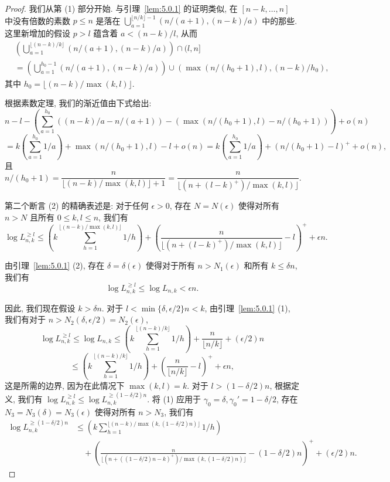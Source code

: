 \begin{proof}
我们从第 (1) 部分开始.
与引理~\ref{lem:5.0.1} 的证明类似, 在 $[n-k,\ldots,n]$ 中没有倍数的素数 $p \le n$ 是落在 $\bigcup_{a=1}^{\lfloor n/k\rfloor-1} (n/(a+1),(n-k)/a)$ 中的那些.
这里新增加的假设 $p > l$ 蕴含着 $a < (n-k)/l$, 从而
\[ \begin{split} 
& \left( \bigcup_{a=1}^{\lfloor (n-k)/k \rfloor} (n/(a+1), (n-k)/a) \right) \cap (l, n] \\ 
& = \left( \bigcup_{a=1}^{h_0-1} (n/(a+1), (n-k)/a) \right) \cup (\max(n/(h_0+1), l), (n-k)/h_0), 
\end{split} \]
其中 $h_0 = \lfloor (n - k)/\max(k, l) \rfloor$.

根据素数定理, 我们的渐近值由下式给出:
\[ n - l - \left(\sum_{a=1}^{h_0} ((n-k)/a - n/(a+1)) - (\max(n/(h_0+1), l) - n/(h_0+1))\right) + o(n) \]
\[ = k \left( \sum_{a=1}^{h_0} 1/a \right) + \max(n/(h_0 + 1), l) - l + o(n) = k \left( \sum_{a=1}^{h_0} 1/a \right) + (n/(h_0 + 1) - l)^+ + o(n), \]
且
\[ n/(h_0 + 1) = \frac{n}{\lfloor (n-k)/\max(k,l) \rfloor + 1} = \frac{n}{\lfloor (n+(l-k)^+)/\max(k,l) \rfloor}. \]

第二个断言 (2) 的精确表述是: 对于任何 $\epsilon > 0$, 存在 $N = N(\epsilon)$ 使得对所有 $n > N$ 且所有 $0 \le k, l \le n$, 我们有
\[ \log L_{n,k}^{\geq l} \le \left(k \sum_{h=1}^{\lfloor (n-k)/\max(k,l)\rfloor} 1/h\right) + \left(\frac{n}{\lfloor (n+(l-k)^+)/\max(k,l)\rfloor} - l\right)^+ + \epsilon n. \]

由引理~\ref{lem:5.0.1} (2), 存在 $\delta = \delta( \epsilon)$ 使得对于所有 $n > N_1(\epsilon)$ 和所有 $k \le \delta n$, 我们有
\[ \log L_{n,k}^{\geq l} \le \log L_{n,k} < \epsilon n. \]

因此, 我们现在假设 $k > \delta n$.
对于 $l < \min\{\delta, \epsilon/2\}n < k$, 由引理~\ref{lem:5.0.1} (1), 我们有对于 $n > N_2(\delta, \epsilon/2) = N_2(\epsilon)$,
\[ \log L_{n,k}^{\geq l} \le \log L_{n,k} \le \left(k \sum_{h=1}^{\lfloor (n-k)/k \rfloor} 1/h\right) + \frac{n}{\lfloor n/k \rfloor} + (\epsilon/2)n \]
\[ \le \left(k \sum_{h=1}^{\lfloor (n-k)/k \rfloor} 1/h\right) + \left(\frac{n}{\lfloor n/k \rfloor} - l\right)^{+} + \epsilon n, \]
这是所需的边界, 因为在此情况下 $\max(k,l)=k$.
对于 $l > (1-\delta/2)n$, 根据定义, 我们有 $\log L_{n,k}^{\geq l} \le \log L_{n,k}^{\geq (1-\delta/2)n}$.
将 (1) 应用于 $\gamma_0=\delta, \gamma_0'=1-\delta/2$, 存在 $N_3=N_3(\delta)=N_3(\epsilon)$ 使得对所有 $n > N_3$, 我们有
\[
\begin{aligned}
\log L_{n,k}^{\geq (1-\delta/2)n} 
&\le \left(k \sum_{h=1}^{\lfloor (n-k)/\max(k,(1-\delta/2)n)\rfloor} 1/h\right) \\
&\quad + \left(\frac{n}{\lfloor (n+((1-\delta/2)n-k)^+)/\max(k,(1-\delta/2)n)\rfloor} - (1-\delta/2)n\right)^+ + (\epsilon/2)n.
\end{aligned}
\]


\end{proof}
